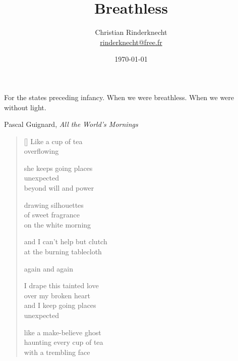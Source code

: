 \documentclass[12pt,a4paper]{article}
\title{Breathless}
\author{Christian Rinderknecht\\
{\small \url{rinderknecht@free.fr}}}
\date{\small\today}
\begin{document}
\maketitle

\epigraph{
  For the states preceding infancy. When we were breathless. When we
  were without light.}{Pascal Guignard,
  \emph{All the World's Mornings}}

\thispagestyle{empty}


\newpage\leavevmode\thispagestyle{empty}\newpage


\newpage

\poemtitle{}

\settowidth{\versewidth}{Like a make-believe ghost}

\bigskip

\begin{verse}[\versewidth]
  Like a cup of tea \\
  overflowing

  she keeps going places \\
  unexpected \\
  beyond will and power

  drawing silhouettes \\
  of sweet fragrance \\
  on the white morning

  and I can't help but clutch \\
  at the burning tablecloth

  again and again

  I drape this tainted love \\
  over my broken heart \\
  and I keep going places \\
  unexpected

  like a make-believe ghost \\
  haunting every cup of tea \\
  with a trembling face
\end{verse}


\newpage
\end{document}
